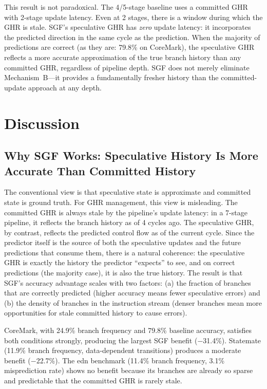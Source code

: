 \documentclass[journal]{IEEEtran}
\begin{document}
\begin{table}[t]
\begin{table}[t]
\begin{table}[t]
\begin{table}[t]
\begin{table}[t]
\begin{table}[t]
This result is not paradoxical. The 4/5-stage baseline uses a committed GHR with 2-stage update latency. Even at 2 stages, there is a window during which the GHR is stale. SGF's speculative GHR has \emph{zero} update latency: it incorporates the predicted direction in the same cycle as the prediction. When the majority of predictions are correct (as they are: 79.8\% on CoreMark), the speculative GHR reflects a more accurate approximation of the true branch history than any committed GHR, regardless of pipeline depth. SGF does not merely eliminate Mechanism~B---it provides a fundamentally fresher history than the committed-update approach at any depth.

\section{Discussion}

\subsection{Why SGF Works: Speculative History Is More Accurate Than Committed History}

The conventional view is that speculative state is approximate and committed state is ground truth. For GHR management, this view is misleading. The committed GHR is always stale by the pipeline's update latency: in a 7-stage pipeline, it reflects the branch history as of 4 cycles ago. The speculative GHR, by contrast, reflects the predicted control flow as of the current cycle. Since the predictor itself is the source of both the speculative updates and the future predictions that consume them, there is a natural coherence: the speculative GHR is exactly the history the predictor ``expects'' to see, and on correct predictions (the majority case), it is also the true history. The result is that SGF's accuracy advantage scales with two factors: (a) the fraction of branches that are correctly predicted (higher accuracy means fewer speculative errors) and (b) the density of branches in the instruction stream (denser branches mean more opportunities for stale committed history to cause errors).

CoreMark, with 24.9\% branch frequency and 79.8\% baseline accuracy, satisfies both conditions strongly, producing the largest SGF benefit ($-$31.4\%). Statemate (11.9\% branch frequency, data-dependent transitions) produces a moderate benefit ($-$22.7\%). The edn benchmark (11.4\% branch frequency, 3.1\% misprediction rate) shows no benefit because its branches are already so sparse and predictable that the committed GHR is rarely stale.


\end{table}
\end{table}
\end{table}
\end{table}
\end{table}
\end{table}
\end{document}
